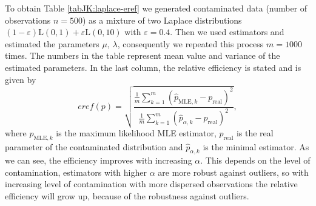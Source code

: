 {\noindent To obtain Table \ref{tabJK:laplace-eref} we generated contaminated data (number of observations $n = 500$) as a mixture of two Laplace distributions $(1-\varepsilon)\mathrm{L}(0,1) + \varepsilon \mathrm{L}(0,10)$ with $\varepsilon =  0.4$.
Then we used \R estimators and estimated the parameters $\mu$, $\lambda$, consequently we repeated this process $m = 1000$ times. The numbers in the table represent mean value and variance of the estimated parameters. In the last column, the relative efficiency is stated and is given by
\begin{equation}
eref(p) = \sqrt{\dfrac{\frac{1}{m}\sum_{k=1}^m (\hat{p}_{\mathrm{MLE} ,k} - p_{\mathrm{real}})^2}{\frac{1}{m}\sum_{k=1}^m (\hat{p}_{\alpha,k} - p_{\mathrm{real}})^2}},
\end{equation}
where $ \hat{p}_{\mathrm{MLE},k}$ is the maximum likelihood MLE estimator, $p_{\mathrm{real}}$ is the real parameter of the contaminated distribution and $\hat{p}_{\alpha,k}$ is the minimal \R estimator. As we can see, the efficiency improves with increasing $\alpha$. This depends on the level of contamination, estimators with higher $\alpha$ are more robust against outliers, so with increasing level of contamination with more dispersed observations the relative efficiency will grow up, because of the robustness against outliers.

}
